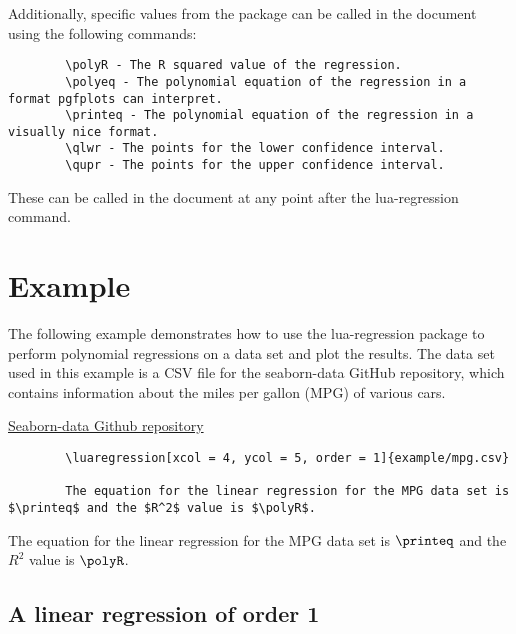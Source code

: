 \documentclass[11pt]{article}
\begin{document}
    \noindent
    Additionally, specific values from the package can be called in the document using the following commands:

    \begin{verbatim}
        \polyR - The R squared value of the regression.
        \polyeq - The polynomial equation of the regression in a format pgfplots can interpret.
        \printeq - The polynomial equation of the regression in a visually nice format.
        \qlwr - The points for the lower confidence interval.
        \qupr - The points for the upper confidence interval.
    \end{verbatim}

    \noindent
    These can be called in the document at any point after the {\ttfamily lua-regression} command.

    \section{Example}

    The following example demonstrates how to use the {\ttfamily lua-regression} package to perform polynomial regressions on a data set and plot the results.
    The data set used in this example is a CSV file for the seaborn-data GitHub repository, which contains information about the miles per gallon (MPG) of various cars.

    \noindent
    \href{https://github.com/mwaskom/seaborn-data}{Seaborn-data Github repository}

    \begin{verbatim}
        \luaregression[xcol = 4, ycol = 5, order = 1]{example/mpg.csv}

        The equation for the linear regression for the MPG data set is $\printeq$ and the $R^2$ value is $\polyR$.
    \end{verbatim}


    \noindent
    The equation for the linear regression for the MPG data set is $\printeq$ and the $R^2$ value is $\polyR$.

    \pagebreak

    \subsection{A linear regression of order 1}
\end{document}

